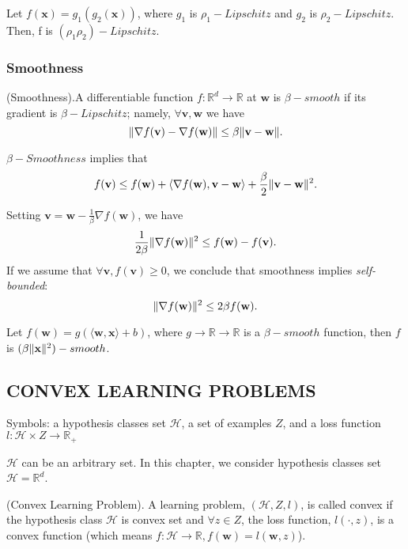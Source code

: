 Let $ f(\mathbf{x})=g_1(g_2(\mathbf{x})) $, where $ g_1 $ is $ \rho_1-Lipschitz $ and $ g_2 $ is $ \rho_2-Lipschitz $.
Then, f is $ (\rho_1 \rho_2)-Lipschitz $.

\subsubsection{Smoothness}

\begin{defn}
	(Smoothness).A differentiable function $ f:\mathbb{R}^d \rightarrow \mathbb{R} $ at $ \mathbf{w} $
	is $ \beta-smooth $ if its gradient is $ \beta-Lipschitz $; namely, $ \forall \mathbf{v}, \mathbf{w} $ we have
	\[ \Arrowvert \nabla f(\mathbf v) - \nabla f(\mathbf w) \Arrowvert \le \beta \Arrowvert \mathbf{v}-\mathbf{w} \Arrowvert.\] 
\end{defn}
$ \beta-Smoothness $ implies that
\[ f(\mathbf{v}) \le f(\mathbf{w}) + \langle \nabla f(\mathbf w), \mathbf v - \mathbf w \rangle
+ \frac{\beta}{2}\Arrowvert \mathbf v - \mathbf w \Arrowvert^2.\]

Setting $ \mathbf{v} = \mathbf{w} - \frac{1}{\beta} \nabla f(\mathbf w) $, we have
\[ \frac{1}{2\beta} \Arrowvert \nabla f(\mathbf{w}) \Arrowvert^2 \le f(\mathbf{w})-f(\mathbf{v}).\]
If we assume that $ \forall \mathbf v, f(\mathbf v) \ge 0 $, we conclude that smoothness implies \emph{self-bounded}:
\[ \Arrowvert \nabla f(\mathbf w) \Arrowvert^2 \le 2 \beta f(\mathbf w).\]

Let $ f(\mathbf w) = g( \langle \mathbf w, \mathbf x \rangle + b) $, where $ g \rightarrow \mathbb R \rightarrow \mathbb R $ 
is a $ \beta-smooth $ function, then $ f $ is $ (\beta \Arrowvert \mathbf x \Arrowvert^2)-smooth $.

\subsection{CONVEX LEARNING PROBLEMS}

Symbols: a hypothesis classes set $ \mathcal{H} $, a set of examples $ Z $, 
and a loss function $ l:\mathcal{H} \times Z \rightarrow \mathbb{R}_+ $

$ \mathcal{H} $ can be an arbitrary set. In this chapter, we consider hypothesis classes set $ \mathcal{H} = \mathbb{R}^d $.

\begin{defn}
	(Convex Learning Problem). A learning problem, $ (\mathcal{H}, Z, l) $, is called convex if the hypothesis class $ \mathcal{H} $
	is convex set and $ \forall z \in Z $, the loss function, $ l(\cdot, z) $, is a convex function
	(which means $ f:\mathcal{H} \rightarrow \mathbb{R}, f(\mathbf{w}) = l(\mathbf{w},z) $).
\end{defn}

